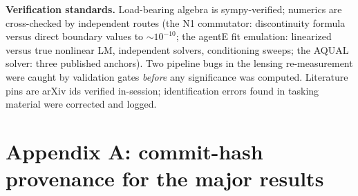 \documentclass[11pt,a4paper]{article}
\begin{document}
\textbf{Verification standards.} Load-bearing algebra is sympy-verified; numerics are cross-checked by independent routes (the N1 commutator: discontinuity formula versus direct boundary values to $\sim{}10^{-10}$; the agentE fit emulation: linearized versus true nonlinear LM, independent solvers, conditioning sweeps; the AQUAL solver: three published anchors). Two pipeline bugs in the lensing re-measurement were caught by validation gates \emph{before} any significance was computed. Literature pins are arXiv ids verified in-session; identification errors found in tasking material were corrected and logged.

\section*{Appendix A: commit-hash provenance for the major results}
\end{document}
